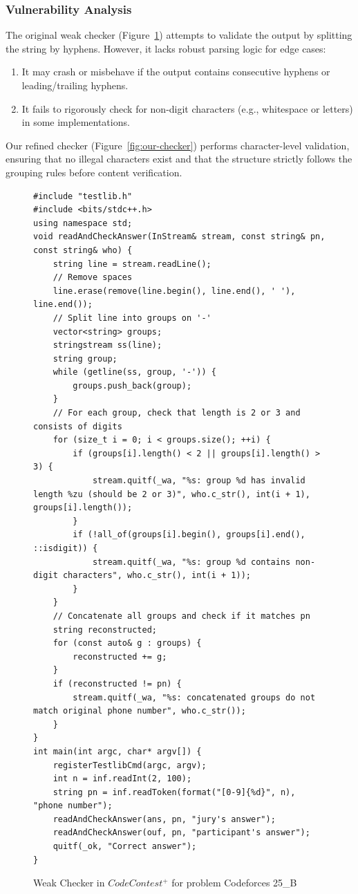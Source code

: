 \documentclass[11pt]{article}
\begin{document}
\subsubsection{Vulnerability Analysis}
The original weak checker (Figure~\ref{fig:weak-checker}) attempts to validate the output by splitting the string by hyphens. However, it lacks robust parsing logic for edge cases:
\begin{enumerate}
    \item It may crash or misbehave if the output contains consecutive hyphens or leading/trailing hyphens.
    \item It fails to rigorously check for non-digit characters (e.g., whitespace or letters) in some implementations.
\end{enumerate}
Our refined checker (Figure~\ref{fig:our-checker}) performs character-level validation, ensuring that no illegal characters exist and that the structure strictly follows the grouping rules before content verification.

\begin{figure}[t]
\centering
\begin{minipage}{0.95\textwidth}
\begin{lstlisting}
#include "testlib.h"
#include <bits/stdc++.h>
using namespace std;
void readAndCheckAnswer(InStream& stream, const string& pn, const string& who) {
    string line = stream.readLine();
    // Remove spaces
    line.erase(remove(line.begin(), line.end(), ' '), line.end());
    // Split line into groups on '-'
    vector<string> groups;
    stringstream ss(line);
    string group;
    while (getline(ss, group, '-')) {
        groups.push_back(group);
    }
    // For each group, check that length is 2 or 3 and consists of digits
    for (size_t i = 0; i < groups.size(); ++i) {
        if (groups[i].length() < 2 || groups[i].length() > 3) {
            stream.quitf(_wa, "%s: group %d has invalid length %zu (should be 2 or 3)", who.c_str(), int(i + 1), groups[i].length());
        }
        if (!all_of(groups[i].begin(), groups[i].end(), ::isdigit)) {
            stream.quitf(_wa, "%s: group %d contains non-digit characters", who.c_str(), int(i + 1));
        }
    }
    // Concatenate all groups and check if it matches pn
    string reconstructed;
    for (const auto& g : groups) {
        reconstructed += g;
    }
    if (reconstructed != pn) {
        stream.quitf(_wa, "%s: concatenated groups do not match original phone number", who.c_str());
    }
}
int main(int argc, char* argv[]) {
    registerTestlibCmd(argc, argv);
    int n = inf.readInt(2, 100);
    string pn = inf.readToken(format("[0-9]{%d}", n), "phone number");
    readAndCheckAnswer(ans, pn, "jury's answer");
    readAndCheckAnswer(ouf, pn, "participant's answer");
    quitf(_ok, "Correct answer");
}

\end{lstlisting}
\end{minipage}
\caption{Weak Checker in $CodeContest^+$ for problem Codeforces 25\_B}
\label{fig:weak-checker}
\end{figure}
\end{document}
